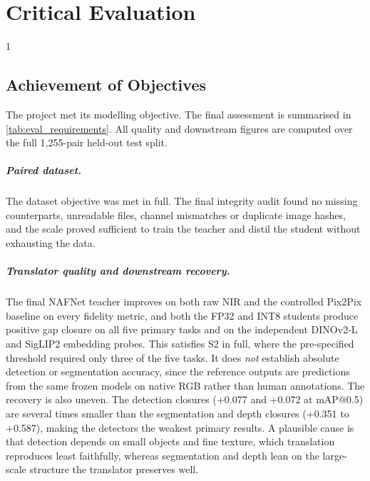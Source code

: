 \doublespacing %

\chapter{Critical Evaluation}
\label{ch:evaluation}

\begin{spacing}{1} %
\minitoc %
\end{spacing} %
\thesisspacing %


\section{Achievement of Objectives}
\label{sec:eval_objectives}

The project met its modelling objective. The final assessment is summarised in \autoref{tab:eval_requirements}. All quality and downstream figures are computed over the full 1{,}255-pair held-out test split.

\paragraph{Paired dataset.}
The dataset objective was met in full. The final integrity audit found no missing counterparts, unreadable files, channel mismatches or duplicate image hashes, and the scale proved sufficient to train the teacher and distil the student without exhausting the data.

\paragraph{Translator quality and downstream recovery.}
The final NAFNet teacher improves on both raw NIR and the controlled Pix2Pix baseline on every fidelity metric, and both the FP32 and INT8 students produce positive gap closure on all five primary tasks and on the independent DINOv2-L and SigLIP2 embedding probes. This satisfies S2 in full, where the pre-specified threshold required only three of the five tasks. It does \emph{not} establish absolute detection or segmentation accuracy, since the reference outputs are predictions from the same frozen models on native RGB rather than human annotations. The recovery is also uneven. The detection closures (+0.077 and +0.072 at mAP@0.5) are several times smaller than the segmentation and depth closures (+0.351 to +0.587), making the detectors the weakest primary results. A plausible cause is that detection depends on small objects and fine texture, which translation reproduces least faithfully, whereas segmentation and depth lean on the large-scale structure the translator preserves well.

